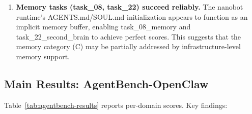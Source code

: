 \begin{enumerate}[leftmargin=2em, label=(\alph*), itemsep=1pt]
  \item \textbf{Memory tasks (task\_08, task\_22) succeed reliably.} The nanobot runtime's AGENTS.md/SOUL.md initialization appears to function as an implicit memory buffer, enabling task\_08\_memory and task\_22\_second\_brain to achieve perfect scores. This suggests that the memory category (C) may be partially addressed by infrastructure-level memory support.

\end{enumerate}


\subsection{Main Results: AgentBench-OpenClaw}
\label{sec:exp:agentbench}

\begin{table}[t]
\centering
\caption{AgentBench-OpenClaw results: per-domain scores (0--100) for three model variants. All models show a consistent memory bottleneck (50.0 on all memory tasks). Research and file-creation tasks are near-ceiling; data-analysis shows the most variance.}
\label{tab:agentbench-results}
\end{table}

Table~\ref{tab:agentbench-results} reports per-domain scores. Key findings:

